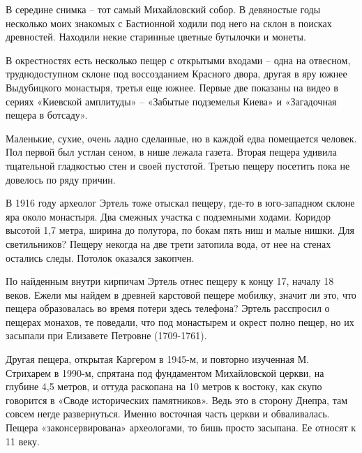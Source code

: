 В середине снимка – тот самый Михайловский собор. В девяностые годы несколько моих знакомых с Бастионной ходили под него на склон в поисках древностей. Находили некие старинные цветные бутылочки и монеты. 




В окрестностях есть несколько пещер с открытыми входами – одна на отвесном, труднодоступном склоне под воссозданием Красного двора, другая в яру южнее Выдубицкого монастыря, третья еще южнее. Первые две показаны на видео в сериях «Киевской амплитуды» – «Забытые подземелья Киева» и «Загадочная пещера в ботсаду».

Маленькие, сухие, очень ладно сделанные, но в каждой едва помещается человек. Пол первой был устлан сеном, в нише лежала газета. Вторая пещера удивила тщательной гладкостью стен и своей пустотой. Третью пещеру посетить пока не довелось по ряду причин.


В 1916 году археолог Эртель тоже отыскал пещеру, где-то в юго-западном склоне яра около монастыря. Два смежных участка с подземными ходами. Коридор высотой 1,7 метра, ширина до полутора, по бокам пять ниш и малые нишки. Для светильников? Пещеру некогда на две трети затопила вода, от нее на стенах остались следы. Потолок оказался закопчен.

По найденным внутри кирпичам Эртель отнес пещеру к концу 17, началу 18 веков. Ежели мы найдем в древней карстовой пещере мобилку, значит ли это, что пещера образовалась во время потери здесь телефона? Эртель расспросил о пещерах монахов, те поведали, что под монастырем и окрест полно пещер, но их засыпали при Елизавете Петровне (1709-1761).

Другая пещера, открытая Каргером в 1945-м, и повторно изученная М. Стрихарем в 1990-м, спрятана под фундаментом Михайловской церкви, на глубине 4,5 метров, и оттуда раскопана на 10 метров к востоку, как скупо говорится в «Своде исторических памятников». Ведь это в сторону Днепра, там совсем негде развернуться. Именно восточная часть церкви и обваливалась. Пещера «законсервирована» археологами, то бишь просто засыпана. Ее относят к 11 веку.

